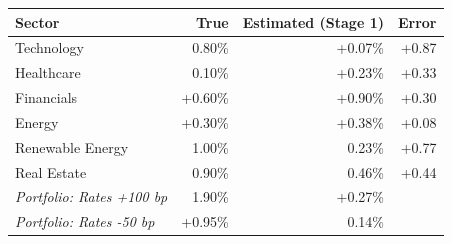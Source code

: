 \begin{tabular}{@{}lrrr@{}}
\toprule
\textbf{Sector} & \textbf{True} & \textbf{Estimated (Stage 1)} & \textbf{Error} \\
\midrule
Technology & \textminus{}0.80\% & +0.07\% & +0.87 \\
Healthcare & \textminus{}0.10\% & +0.23\% & +0.33 \\
Financials & +0.60\% & +0.90\% & +0.30 \\
Energy & +0.30\% & +0.38\% & +0.08 \\
Renewable Energy & \textminus{}1.00\% & \textminus{}0.23\% & +0.77 \\
Real Estate & \textminus{}0.90\% & \textminus{}0.46\% & +0.44 \\
\midrule
\textit{Portfolio: Rates +100 bp} & \textminus{}1.90\% & +0.27\% & \\
\textit{Portfolio: Rates -50 bp} & +0.95\% & \textminus{}0.14\% & \\
\bottomrule
\end{tabular}